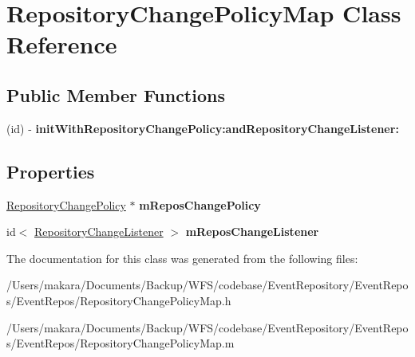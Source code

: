 \hypertarget{interface_repository_change_policy_map}{
\section{\-Repository\-Change\-Policy\-Map \-Class \-Reference}
\label{interface_repository_change_policy_map}
}
\subsection*{\-Public \-Member \-Functions}
\begin{DoxyCompactItemize}
\item 
\hypertarget{interface_repository_change_policy_map_a089c097a6eaa1eaf22521d2d43c11df8}{
(id) -\/ {\bfseries init\-With\-Repository\-Change\-Policy\-:and\-Repository\-Change\-Listener\-:}}
\label{interface_repository_change_policy_map_a089c097a6eaa1eaf22521d2d43c11df8}

\end{DoxyCompactItemize}
\subsection*{\-Properties}
\begin{DoxyCompactItemize}
\item 
\hypertarget{interface_repository_change_policy_map_a7e20506c14d87f1ec4df225c803ffdfd}{
\hyperlink{interface_repository_change_policy}{\-Repository\-Change\-Policy} $\ast$ {\bfseries m\-Repos\-Change\-Policy}}
\label{interface_repository_change_policy_map_a7e20506c14d87f1ec4df225c803ffdfd}

\item 
\hypertarget{interface_repository_change_policy_map_a9b054b9014b804c718001926cdbcae30}{
id$<$ \hyperlink{protocol_repository_change_listener-p}{\-Repository\-Change\-Listener} $>$ {\bfseries m\-Repos\-Change\-Listener}}
\label{interface_repository_change_policy_map_a9b054b9014b804c718001926cdbcae30}

\end{DoxyCompactItemize}


\-The documentation for this class was generated from the following files\-:\begin{DoxyCompactItemize}
\item 
/\-Users/makara/\-Documents/\-Backup/\-W\-F\-S/codebase/\-Event\-Repository/\-Event\-Repos/\-Event\-Repos/\-Repository\-Change\-Policy\-Map.\-h\item 
/\-Users/makara/\-Documents/\-Backup/\-W\-F\-S/codebase/\-Event\-Repository/\-Event\-Repos/\-Event\-Repos/\-Repository\-Change\-Policy\-Map.\-m\end{DoxyCompactItemize}
